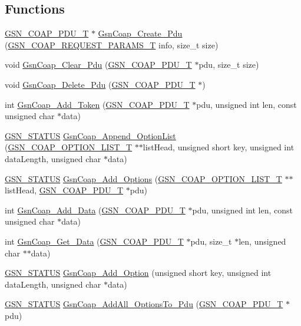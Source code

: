 \subsection*{Functions}
\begin{DoxyCompactItemize}
\item 
\hyperlink{a00538_afde87a99bfaad4a8beac3df27a309976}{GSN\_\-COAP\_\-PDU\_\-T} $\ast$ \hyperlink{a00538_a63855ed522f323e4bce8db59ac7295d5}{GsnCoap\_\-Create\_\-Pdu} (\hyperlink{a00456}{GSN\_\-COAP\_\-REQUEST\_\-PARAMS\_\-T} info, size\_\-t size)
\item 
void \hyperlink{a00538_a40995304881bff62c7031e17b0ba1b97}{GsnCoap\_\-Clear\_\-Pdu} (\hyperlink{a00538_afde87a99bfaad4a8beac3df27a309976}{GSN\_\-COAP\_\-PDU\_\-T} $\ast$pdu, size\_\-t size)
\item 
void \hyperlink{a00538_a15db3b315a66fc112aca707c26d98127}{GsnCoap\_\-Delete\_\-Pdu} (\hyperlink{a00538_afde87a99bfaad4a8beac3df27a309976}{GSN\_\-COAP\_\-PDU\_\-T} $\ast$)
\item 
int \hyperlink{a00538_aa895a7edf6c84238d9503826d70c1e54}{GsnCoap\_\-Add\_\-Token} (\hyperlink{a00538_afde87a99bfaad4a8beac3df27a309976}{GSN\_\-COAP\_\-PDU\_\-T} $\ast$pdu, unsigned int len, const unsigned char $\ast$data)
\item 
\hyperlink{a00660_gada5951904ac6110b1fa95e51a9ddc217}{GSN\_\-STATUS} \hyperlink{a00538_aa7b6484f070191314e7b76952770d8f7}{GsnCoap\_\-Append\_\-OptionList} (\hyperlink{a00041}{GSN\_\-COAP\_\-OPTION\_\-LIST\_\-T} $\ast$$\ast$listHead, unsigned short key, unsigned int dataLength, unsigned char $\ast$data)
\item 
\hyperlink{a00660_gada5951904ac6110b1fa95e51a9ddc217}{GSN\_\-STATUS} \hyperlink{a00538_a803cb5b81bfef54ed7b23823fcbac95e}{GsnCoap\_\-Add\_\-Options} (\hyperlink{a00041}{GSN\_\-COAP\_\-OPTION\_\-LIST\_\-T} $\ast$$\ast$listHead, \hyperlink{a00538_afde87a99bfaad4a8beac3df27a309976}{GSN\_\-COAP\_\-PDU\_\-T} $\ast$pdu)
\item 
int \hyperlink{a00538_a7cdc194a8829b99a0efec0ba4abe7385}{GsnCoap\_\-Add\_\-Data} (\hyperlink{a00538_afde87a99bfaad4a8beac3df27a309976}{GSN\_\-COAP\_\-PDU\_\-T} $\ast$pdu, unsigned int len, const unsigned char $\ast$data)
\item 
int \hyperlink{a00538_a522f0039c73bba09720d6deb09d77b90}{GsnCoap\_\-Get\_\-Data} (\hyperlink{a00538_afde87a99bfaad4a8beac3df27a309976}{GSN\_\-COAP\_\-PDU\_\-T} $\ast$pdu, size\_\-t $\ast$len, unsigned char $\ast$$\ast$data)
\item 
\hyperlink{a00660_gada5951904ac6110b1fa95e51a9ddc217}{GSN\_\-STATUS} \hyperlink{a00538_a20323cf1abc087219e07d9424a41c801}{GsnCoap\_\-Add\_\-Option} (unsigned short key, unsigned int dataLength, unsigned char $\ast$data)
\item 
\hyperlink{a00660_gada5951904ac6110b1fa95e51a9ddc217}{GSN\_\-STATUS} \hyperlink{a00538_a1419c409659c063ccef4c9c83b9a6ee5}{GsnCoap\_\-AddAll\_\-OptionsTo\_\-Pdu} (\hyperlink{a00538_afde87a99bfaad4a8beac3df27a309976}{GSN\_\-COAP\_\-PDU\_\-T} $\ast$pdu)
\end{DoxyCompactItemize}


